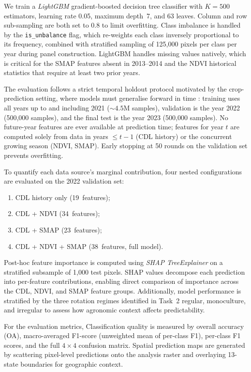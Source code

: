 \documentclass{article}
\begin{document}
We train a \textit{LightGBM} gradient-boosted decision tree classifier
\citep{ke2017lightgbm} with $K = 500$ estimators, learning rate 0.05,
maximum depth~7, and 63 leaves.
Column and row sub-sampling are both set to 0.8 to limit overfitting.
Class imbalance is handled by the \texttt{is\_unbalance} flag, which
re-weights each class inversely proportional to its frequency, combined
with stratified sampling of 125{,}000 pixels per class per year during
panel construction.
LightGBM handles missing values natively, which is critical for the SMAP
features absent in 2013--2014 and the NDVI historical statistics that
require at least two prior years.

The evaluation follows a strict temporal holdout protocol motivated by the
crop-prediction setting, where models must generalise forward in time
\citep{zhang2019cropprediction, abernethy2023csb}:
training uses all years up to and including 2021 (${\sim}4.5$M samples),
validation is the year 2022 (500{,}000 samples), and the final test is the
year 2023 (500{,}000 samples).
No future-year features are ever available at prediction time; features for
year $t$ are computed solely from data in years $\leq t{-}1$ (CDL history)
or the concurrent growing season (NDVI, SMAP).
Early stopping at 50 rounds on the validation set prevents overfitting.


To quantify each data source's marginal contribution, four nested
configurations are evaluated on the 2022 validation set:
\begin{enumerate}[label=\Alph*.]
    \item CDL history only (19~features);
    \item CDL + NDVI (34~features);
    \item CDL + SMAP (23~features);
    \item CDL + NDVI + SMAP (38~features, full model).
\end{enumerate}

Post-hoc feature importance is computed using \textit{SHAP TreeExplainer}
\citep{lundberg2017shap} on a stratified subsample of 1{,}000 test
pixels.
SHAP values decompose each prediction into per-feature contributions,
enabling direct comparison of importance across the CDL, NDVI, and SMAP
feature groups.
Additionally, model performance is stratified by the three rotation regimes
identified in Task~2 regular, monoculture, and irregular to assess
how agronomic context affects predictability.

For the evaluation metrics,
Classification quality is measured by overall accuracy (OA), macro-averaged
F1-score (unweighted mean of per-class F1), per-class F1 scores, and the
full $4 \times 4$ confusion matrix.
Spatial prediction maps are generated by scattering pixel-level predictions
onto the analysis raster and overlaying 13-state boundaries for geographic
context.
\end{document}
